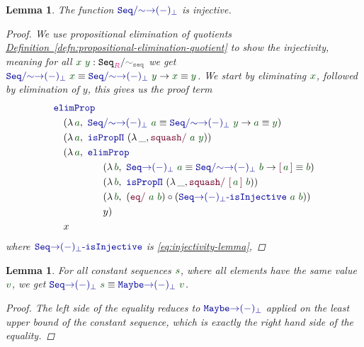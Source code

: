 \documentclass[twoside,11pt,openright]{report}
\theoremstyle{plain} %
\newtheorem{lem}[thm]{Lemma}
\theoremstyle{definition}
\theoremstyle{remark}
\newcommand*{\defref}[1]{\hyperref[defn:#1]{Definition~\ref*{defn:#1}}}
\newcommand*{\term}[1]{\textcolor{green!30!black}{#1}} %
\newcommand*{\type}[1]{\textcolor{magenta!90!black}{#1}}
\newcommand*{\relation}[1]{\textcolor{gray!75!black}{\ensuremath{\mathtt{#1}}}}
\newcommand*{\function}[1]{\textcolor{blue!60!black}{\ensuremath{\mathtt{#1}}}}
\newcommand*{\constructor}[1]{\textcolor{purple!60!black}{\ensuremath{\mathtt{#1}}}}
\newcommand*{\typeformer}[1]{\ensuremath{\mathtt{#1}}}
\newcommand*{\quotientconstructor}[1]{\constructor{[}\,#1\,\constructor{]}}
\begin{document}
\begin{lem}
  The function \(\function{Seq/{\sim}{\rightarrow}(-)_\bot}\) is injective.
  \begin{proof}
    We use propositional elimination of quotients \defref{propositional-elimination-quotient}  to show the injectivity, meaning for all \(\term{x}~\term{y} : \typeformer{Seq}_{\type{R}} / \relation{\sim_{seq}}\) we get \(\function{Seq/{\sim}{\rightarrow}(-)_\bot}~\term{x} \equiv \function{Seq/{\sim}{\rightarrow}(-)_\bot}~\term{y} \rightarrow \term{x} \equiv \term{y}\). We start by eliminating \(\term{x}\), followed by elimination of \(y\), this gives us the proof term 
    \begin{equation}
      \begin{aligned}
        &\function{elimProp} \\
        &\quad (\lambda\,\term{a},~\function{Seq/{\sim}{\rightarrow}(-)_\bot}~\term{a} \equiv \function{Seq/{\sim}{\rightarrow}(-)_\bot}~\term{y} \rightarrow \term{a} \equiv \term{y}) \\
        &\quad (\lambda\,\term{a},~\function{isProp\Pi}~(\lambda\,\_, \constructor{squash/}~\term{a}~\term{y})) \\
        &\quad (\lambda\,\term{a},~\function{elimProp} \\
        &\qquad\qquad\quad (\lambda\,\term{b},~\function{Seq{\rightarrow}(-)_\bot}~\term{a} \equiv \function{Seq/{\sim}{\rightarrow}(-)_\bot}~\term{b} \rightarrow \quotientconstructor{\term{a}} \equiv \term{b}) \\
        &\qquad\qquad\quad (\lambda\,\term{b},~\function{isProp\Pi}~(\lambda\,\_, \constructor{squash/}~\quotientconstructor{\term{a}}~\term{b})) \\
        &\qquad\qquad\quad (\lambda\,\term{b},~(\constructor{eq/}~\term{a}~\term{b}) \circ (\function{Seq{\rightarrow}(-)_\bot\text{-}isInjective}~\term{a}~\term{b})) \\
        &\qquad\qquad\quad y) \\
        &\quad x
      \end{aligned}
    \end{equation}
    where \(\function{Seq{\rightarrow}(-)_\bot\text{-}isInjective}\) is \eqref{eq:injectivity-lemma}, 
  \end{proof}
\end{lem}
\begin{lem}
  \label{eq:constant-sequence-equality}
  For all constant sequences \(\term{s}\), where all elements have the same value \(\term{v}\), we get \(\function{Seq{\rightarrow}(-)_\bot}~\term{s} \equiv \function{Maybe{\rightarrow}(-)_\bot}~\term{v}\).
  \begin{proof}
    The left side of the equality reduces to \(\function{Maybe{\rightarrow}(-)_\bot}\) applied on the least upper bound of the constant sequence, which is exactly the right hand side of the equality.
  \end{proof}
\end{lem}
\end{document}
